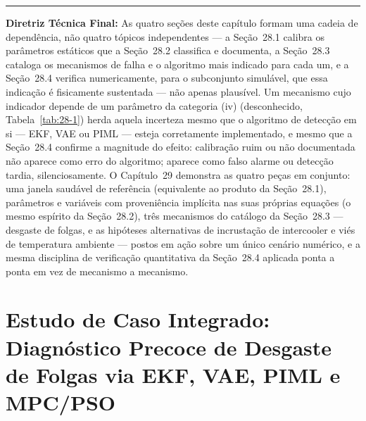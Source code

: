 \documentclass[12pt,a4paper]{article}
\numberwithin{equation}{section}
\numberwithin{table}{section}
\numberwithin{figure}{section}
\begin{document}
{\vspace{1em}
\hrule
\vspace{1em}

\textbf{Diretriz Técnica Final:} As quatro seções deste capítulo formam uma cadeia de dependência, não quatro tópicos independentes — a Seção~28.1 calibra os parâmetros estáticos que a Seção~28.2 classifica e documenta, a Seção~28.3 cataloga os mecanismos de falha e o algoritmo mais indicado para cada um, e a Seção~28.4 verifica numericamente, para o subconjunto simulável, que essa indicação é fisicamente sustentada — não apenas plausível. Um mecanismo cujo indicador depende de um parâmetro da categoria (iv) (desconhecido, Tabela~\ref{tab:28-1}) herda aquela incerteza mesmo que o algoritmo de detecção em si — EKF, VAE ou PIML — esteja corretamente implementado, e mesmo que a Seção~28.4 confirme a magnitude do efeito: calibração ruim ou não documentada não aparece como erro do algoritmo; aparece como falso alarme ou detecção tardia, silenciosamente. O Capítulo~29 demonstra as quatro peças em conjunto: uma janela saudável de referência (equivalente ao produto da Seção~28.1), parâmetros e variáveis com proveniência implícita nas suas próprias equações (o mesmo espírito da Seção~28.2), três mecanismos do catálogo da Seção~28.3 — desgaste de folgas, e as hipóteses alternativas de incrustação de intercooler e viés de temperatura ambiente — postos em ação sobre um único cenário numérico, e a mesma disciplina de verificação quantitativa da Seção~28.4 aplicada ponta a ponta em vez de mecanismo a mecanismo.



\clearpage
\section{Estudo de Caso Integrado: Diagnóstico Precoce de Desgaste de Folgas via EKF, VAE, PIML e MPC/PSO}

}
\end{document}
